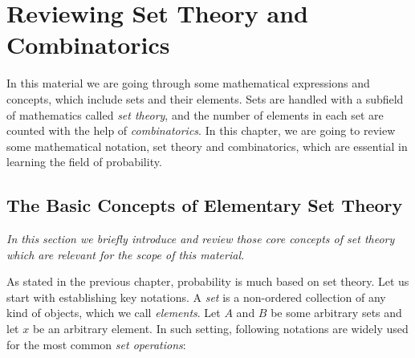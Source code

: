 \documentclass[12pt,a4paper,leqno]{report}
\theoremstyle{plain}
\theoremstyle{definition}
\begin{document}

\chapter{Reviewing Set Theory and Combinatorics}\label{chap1}

In this material we are going through some mathematical expressions and concepts, which include sets and their elements. Sets are handled with a subfield of mathematics called \emph{set theory}, and the number of elements in each set are counted with the help of \emph{combinatorics}. In this chapter, we are going to review some mathematical notation, set theory and combinatorics, which are essential in learning the field of probability.

\section{The Basic Concepts of Elementary Set Theory}

\emph{In this section we briefly introduce and review those core concepts of set theory which are relevant for the scope of this material.}

As stated in the previous chapter, probability is much based on set theory. Let us start with establishing key notations. A \emph{set} is a non-ordered collection of any kind of objects, which we call \emph{elements}. Let $A$ and $B$ be some arbitrary sets and let $x$ be an arbitrary element. In such setting, following notations are widely used for the most common \emph{set operations}:

\bigskip
\end{document}
